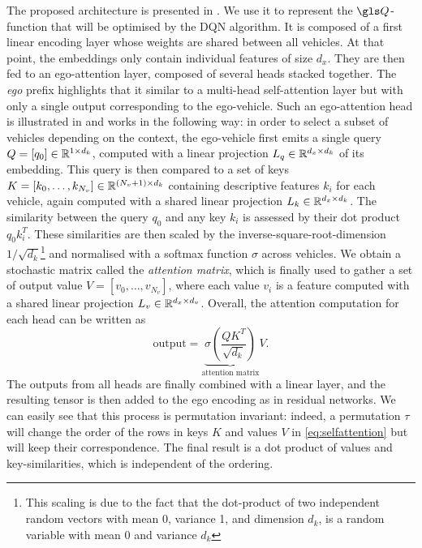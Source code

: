 The proposed architecture is presented in . We use it to represent the $\Q$-function that will be optimised by the \gls{DQN} algorithm. It is composed of a first linear encoding layer whose weights are shared between all vehicles. At that point, the embeddings only contain individual features of size $d_x$. They are then fed to an ego-attention layer, composed of several heads stacked together. The \emph{ego} prefix highlights that it similar to a multi-head self-attention layer \citep{Vaswani2017} but with only a single output corresponding to the ego-vehicle. Such an ego-attention head is illustrated in  and works in the following way: in order to select a subset of vehicles depending on the context, the ego-vehicle  first emits a single query $Q = [q_0]\in\mathbb{R}^{1 \times d_k}$, computed with a linear projection $L_q\in\mathbb{R}^{d_x \times d_k}$ of its embedding. This query is then compared to a set of keys $K = [k_0, \dots, k_{N_v}]\in\mathbb{R}^{(N_v+1) \times d_k}$ containing descriptive features $k_i$ for each vehicle, again computed with a shared linear projection $L_k\in\mathbb{R}^{d_x \times d_k}$. The similarity between the query $q_0$ and any key $k_i$ is assessed by their dot product $q_0 k_i^T$. These similarities are then scaled by the inverse-square-root-dimension $1/\sqrt{d_k}$\footnote{This scaling is due to the fact that the dot-product of two independent random vectors with mean 0,  variance 1, and dimension $d_k$, is a random variable with mean 0 and variance $d_k$} and normalised with a softmax function $\sigma$ across vehicles. We obtain a stochastic matrix called the \emph{attention matrix}, which is finally used to gather a set of output value $V = [v_0, \dots, v_{N_v}]$, where each value $v_i$ is a feature computed with a shared linear projection $L_v\in\mathbb{R}^{d_x \times d_v}$. Overall, the attention computation for each head can be written as
\begin{equation}
\text{output}=\underbrace{\sigma\left(\frac{QK^T}{\sqrt{d_k}}\right)}_{\text{attention matrix}}V.
\label{eq:selfattention}
\end{equation}
The outputs from all heads are finally combined with a linear layer, and the resulting tensor is then added to the ego encoding as in residual networks. We can easily see that this process is permutation invariant: indeed, a permutation $\tau$ will change the order of the rows in keys $K$ and values $V$ in \eqref{eq:selfattention} but will keep their correspondence. The final result is a dot product of values and key-similarities, which is independent of the ordering.


